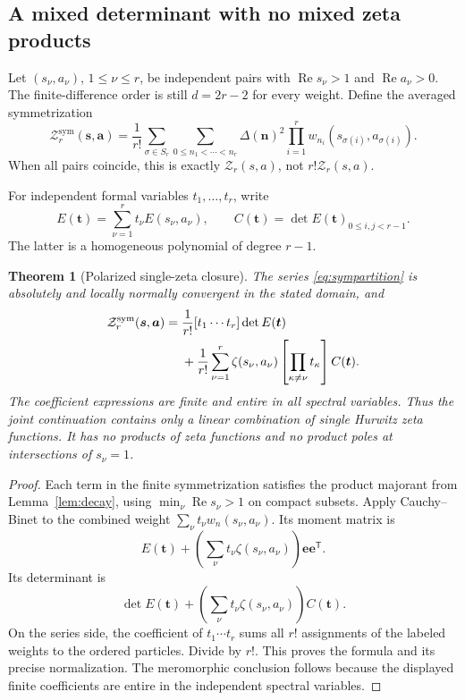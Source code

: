 \documentclass[11pt,letterpaper]{article}
\numberwithin{equation}{section}
\newtheorem{theorem}{Theorem}[section]
\theoremstyle{definition}\newtheorem{definition}[theorem]{Definition}
\theoremstyle{remark}\newtheorem{remark}[theorem]{Remark}
\DeclareMathOperator{\Rea}{Re}
\newcommand{\Z}{\mathcal Z}\newcommand{\Bell}{\mathcal B}
\newcommand{\ee}{\bm e}
\newcommand{\sym}{\mathrm{sym}}
\begin{document}
\subsection{A mixed determinant with no mixed zeta products}
Let $(s_\nu,a_\nu)$, $1\le\nu\le r$, be independent pairs with
$\Rea s_\nu>1$ and $\Rea a_\nu>0$. The finite-difference order is
still $d=2r-2$ for every weight. Define the averaged symmetrization
\begin{equation}\label{eq:sympartition}
 \Z_r^{\sym}(\bm s,\bm a)
 =\frac1{r!}\sum_{\sigma\in S_r}
   \sum_{0\le n_1<\cdots<n_r}\Delta(\bm n)^2
      \prod_{i=1}^r w_{n_i}(s_{\sigma(i)},a_{\sigma(i)}).
\end{equation}
When all pairs coincide, this is exactly $\Z_r(s,a)$, not $r!\Z_r(s,a)$.

For independent formal variables $t_1,\ldots,t_r$, write
\[
 E(\bm t)=\sum_{\nu=1}^r t_\nu E(s_\nu,a_\nu),\qquad
 C(\bm t)=\det E(\bm t)_{0\le i,j<r-1}.
\]
The latter is a homogeneous polynomial of degree $r-1$.

\begin{theorem}[Polarized single-zeta closure]\label{thm:polarized}
The series \eqref{eq:sympartition} is absolutely and locally normally
convergent in the stated domain, and
\begin{align}
 \Z_r^{\sym}(\bm s,\bm a)
 ={}&\frac1{r!}[t_1\cdots t_r]\det E(\bm t)\notag\\
 &+\frac1{r!}\sum_{\nu=1}^r\zeta(s_\nu,a_\nu)
       \left[\prod_{\kappa\ne\nu}t_\kappa\right]C(\bm t).
       \label{eq:polarized}
\end{align}
The coefficient expressions are finite and entire in all spectral
variables. Thus the joint continuation contains only a linear combination
of single Hurwitz zeta functions. It has no products of zeta functions
and no product poles at intersections of $s_\nu=1$.
\end{theorem}
\begin{proof}
Each term in the finite symmetrization satisfies the product majorant from
Lemma~\ref{lem:decay}, using $\min_\nu\Rea s_\nu>1$ on compact subsets.
Apply Cauchy--Binet to the combined weight
$\sum_\nu t_\nu w_n(s_\nu,a_\nu)$. Its moment matrix is
\[
 E(\bm t)+\left(\sum_\nu t_\nu\zeta(s_\nu,a_\nu)\right)
       \ee\ee^{\mathsf T}.
\]
Its determinant is
\[
 \det E(\bm t)+
 \left(\sum_\nu t_\nu\zeta(s_\nu,a_\nu)\right)C(\bm t).
\]
On the series side, the coefficient of $t_1\cdots t_r$ sums all $r!$
assignments of the labeled weights to the ordered particles. Divide by
$r!$. This proves the formula and its precise normalization. The
meromorphic conclusion follows because the displayed finite coefficients
are entire in the independent spectral variables.
\end{proof}
\end{document}

